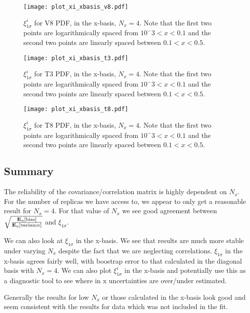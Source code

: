 \begin{figure}
    \centering
    \texttt{[image: plot\_xi\_xbasis\_v8.pdf]}
    \caption{
        $\xi^{i}_{1\sigma}$ for V8 PDF, in the x-basis, $N_x=4$. Note that
        the first two points are logarithmically spaced from $10^-3 < x < 0.1$
        and the second two points are linearly spaced between $0.1 < x < 0.5$.
    }
    \label{fig:pdfxiv8}
\end{figure}

\begin{figure}
    \centering
    \texttt{[image: plot\_xi\_xbasis\_t3.pdf]}
    \caption{
        $\xi^{i}_{1\sigma}$ for T3 PDF, in the x-basis, $N_x=4$. Note that
        the first two points are logarithmically spaced from $10^-3 < x < 0.1$
        and the second two points are linearly spaced between $0.1 < x < 0.5$.
    }
    \label{fig:pdfxit3}
\end{figure}

\begin{figure}
    \centering
    \texttt{[image: plot\_xi\_xbasis\_t8.pdf]}
    \caption{
        $\xi^{i}_{1\sigma}$ for T8 PDF, in the x-basis, $N_x=4$. Note that
        the first two points are logarithmically spaced from $10^-3 < x < 0.1$
        and the second two points are linearly spaced between $0.1 < x < 0.5$.
    }
    \label{fig:pdfxit8}
\end{figure}

\subsection{Summary}

The reliability of the covariance/correlation matrix is highly dependent on
$N_x$. For the number of replicas we have access to, we appear to only get a
reasonable result for $N_x=4$. For that value of $N_x$ we see good agreement
between $\sqrt{\frac{\mathbf{E}_{\eta}\left[ {\rm bias} \right]}{\mathbf{E}_{\eta}\left[ {\rm variance} \right]}}$ and $\xi_{1\sigma}$.

We can also look at $\xi_{1\sigma}$ in the x-basis. We see that results are
much more stable under varying $N_x$ despite the fact that we are neglecting
correlations. $\xi_{1\sigma}$ in the x-basis agrees fairly well, with boostrap
error to that calculated in the diagonal basis with $N_x=4$. We can also
plot $\xi_{1\sigma}^i$ in the x-basis and potentially use this as a diagnostic
tool to see where in x uncertainties are over/under estimated.

Generally the results for low $N_x$ or those calculated in the x-basis look good
and seem consistent with the results for data which was not included in the fit.

